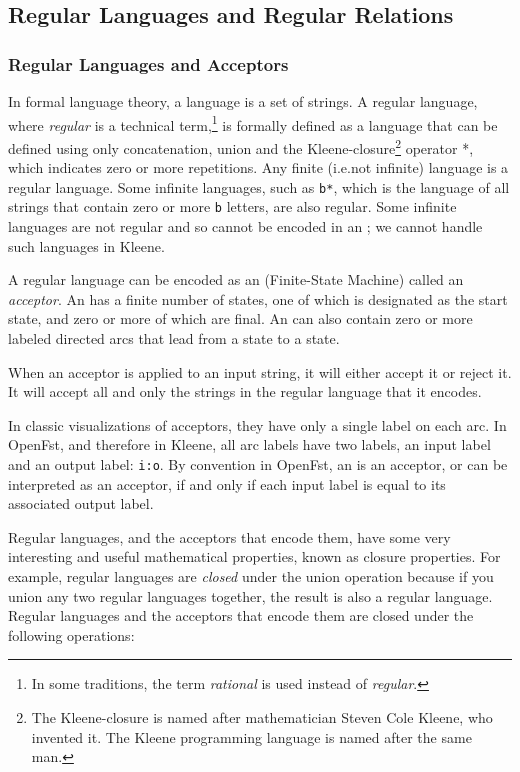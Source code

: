 \subsection{Regular Languages and Regular Relations}

\subsubsection{Regular Languages and Acceptors}

In formal language theory, a language is a set of strings.  A regular language, where
\emph{regular} is a technical term,\footnote{In some traditions, the term
\emph{rational} is used instead of \emph{regular}.} is formally defined as a language that can be defined
using only concatenation, union and the Kleene-closure\footnote{The Kleene-closure is named
after mathematician Steven Cole Kleene, who invented it.  The Kleene programming language
is named after the same man.} operator *, which indicates zero or
more repetitions.  Any finite (i.e.\@ not infinite) language is a regular language.  Some infinite languages,
such as \verb!b*!, which is the language of all strings that contain zero or more
\texttt{b} letters, are also regular.  Some infinite languages are not regular
and so cannot be encoded in an \fsm{}; we cannot handle such languages in Kleene.

A regular language can be encoded as an \fsm{} (Finite-State Machine) called an
\emph{acceptor}.  An \fsm{} has a finite number of states, one of which is designated as the
start state, and zero or more of which are final.  An \fsm{} can also contain zero or
more labeled directed arcs that lead from a state to a state.

When an acceptor is applied to an input string, it will either accept it or reject it.  It
will accept all and only the strings in the regular language that it encodes.

In classic visualizations of acceptors, they have only a single label on
each arc.  In OpenFst, and therefore in Kleene, all arc labels have two labels, an input
label and an output label: \verb!i:o!.  By convention in OpenFst, an \fsm{} is an acceptor,
or can be interpreted as an acceptor,
if and only if each input label is equal to its associated output label.

Regular languages, and the acceptors that encode them, have some very interesting and
useful
mathematical properties, known as closure properties.  For example, regular languages are
\emph{closed} under the union operation because if you union any two regular languages together, the
result is also a regular language.  Regular languages and the acceptors that
encode them are closed under the following
operations:

